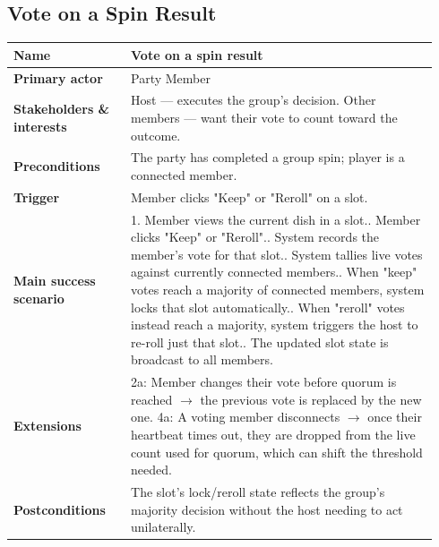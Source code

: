 \documentclass[sigconf]{acmart}
\begin{document}
\subsection*{Vote on a Spin Result}
{\footnotesize
\begin{supertabular}{@{}p{0.26\linewidth}p{0.68\linewidth}@{}}
\textbf{Name} & Vote on a spin result \\
\hline
\textbf{Primary actor} & Party Member \\
\hline
\textbf{Stakeholders \& interests} & Host --- executes the group's decision. Other members --- want their vote to count toward the outcome. \\
\hline
\textbf{Preconditions} & The party has completed a group spin; player is a connected member. \\
\hline
\textbf{Trigger} & Member clicks "Keep" or "Reroll" on a slot. \\
\hline
\textbf{Main success scenario} & 1. Member views the current dish in a slot.. Member clicks "Keep" or "Reroll".. System records the member's vote for that slot.. System tallies live votes against currently connected members.. When "keep" votes reach a majority of connected members, system locks that slot automatically.. When "reroll" votes instead reach a majority, system triggers the host to re-roll just that slot.. The updated slot state is broadcast to all members. \\
\hline
\textbf{Extensions} & 2a: Member changes their vote before quorum is reached $\rightarrow$ the previous vote is replaced by the new one.\newline
4a: A voting member disconnects $\rightarrow$ once their heartbeat times out, they are dropped from the live count used for quorum, which can shift the threshold needed. \\
\hline
\textbf{Postconditions} & The slot's lock/reroll state reflects the group's majority decision without the host needing to act unilaterally. \\
\end{supertabular}
}
\end{document}
